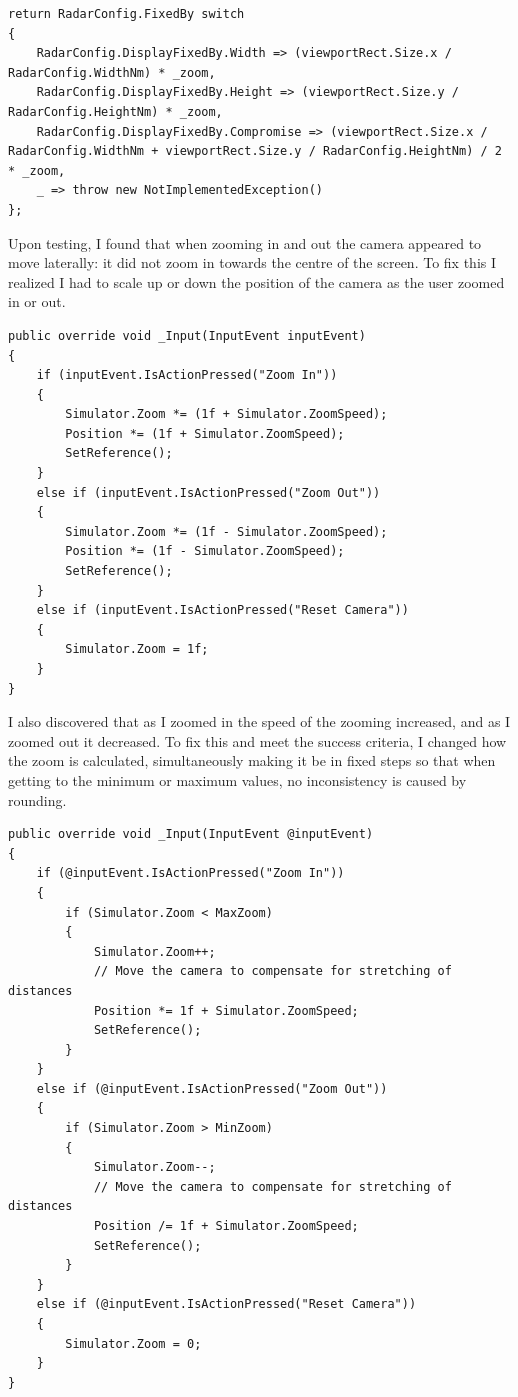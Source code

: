 \documentclass{article}
\begin{document}
\lstset{style=csharp}
\begin{lstlisting}[label={lst:zoomscalecalc},caption=Scale calculation with zoom]
return RadarConfig.FixedBy switch
{
    RadarConfig.DisplayFixedBy.Width => (viewportRect.Size.x / RadarConfig.WidthNm) * _zoom,
    RadarConfig.DisplayFixedBy.Height => (viewportRect.Size.y / RadarConfig.HeightNm) * _zoom,
    RadarConfig.DisplayFixedBy.Compromise => (viewportRect.Size.x / RadarConfig.WidthNm + viewportRect.Size.y / RadarConfig.HeightNm) / 2 * _zoom,
    _ => throw new NotImplementedException()
};
\end{lstlisting}
Upon testing, I found that when zooming in and out the camera appeared to move laterally: it did not zoom in towards the centre of the screen.
To fix this I realized I had to scale up or down the position of the camera as the user zoomed in or out.
\lstset{style=csharp}
\begin{lstlisting}[caption=Modified zoom function to scale position]
public override void _Input(InputEvent inputEvent)
{
    if (inputEvent.IsActionPressed("Zoom In"))
    {
        Simulator.Zoom *= (1f + Simulator.ZoomSpeed);
        Position *= (1f + Simulator.ZoomSpeed);
        SetReference();
    }
    else if (inputEvent.IsActionPressed("Zoom Out"))
    {
        Simulator.Zoom *= (1f - Simulator.ZoomSpeed);
        Position *= (1f - Simulator.ZoomSpeed);
        SetReference();
    }
    else if (inputEvent.IsActionPressed("Reset Camera"))
    {
        Simulator.Zoom = 1f;
    }
}
\end{lstlisting}
I also discovered that as I zoomed in the speed of the zooming increased, and as I zoomed out it decreased.
To fix this and meet the success criteria, I changed how the zoom is calculated, simultaneously making it be in fixed steps so that when getting to the minimum or maximum values, no inconsistency is caused by rounding.
\lstset{style=csharp}
\begin{lstlisting}[caption=Zooming in increments]
public override void _Input(InputEvent @inputEvent)
{
    if (@inputEvent.IsActionPressed("Zoom In"))
    {
        if (Simulator.Zoom < MaxZoom)
        {
            Simulator.Zoom++;
            // Move the camera to compensate for stretching of distances
            Position *= 1f + Simulator.ZoomSpeed;
            SetReference();
        }
    }
    else if (@inputEvent.IsActionPressed("Zoom Out"))
    {
        if (Simulator.Zoom > MinZoom)
        {
            Simulator.Zoom--;
            // Move the camera to compensate for stretching of distances
            Position /= 1f + Simulator.ZoomSpeed;
            SetReference();
        }
    }
    else if (@inputEvent.IsActionPressed("Reset Camera"))
    {
        Simulator.Zoom = 0;
    }
}
\end{lstlisting}
\end{document}

